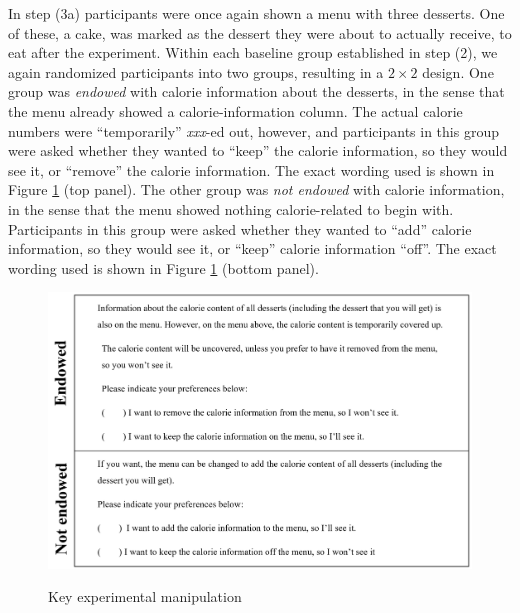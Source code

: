 
In step (3a) participants were once again shown a menu with three desserts. One of these, a cake, was marked as the dessert they were about to actually receive, to eat after the experiment. Within each baseline group established in step (2), we again randomized participants into two groups, resulting in a $2 \times 2$ design. One group was \emph{endowed} with calorie information about the desserts, in the sense that the menu already showed a calorie-information column. The actual calorie numbers were \enquote{temporarily} \emph{xxx}-ed out, however, and participants in this group were asked whether they wanted to \enquote{keep} the calorie information, so they would see it, or \enquote{remove} the calorie information. The exact wording used is shown in Figure \ref{fig:expManipulation} (top panel). The other group was \emph{not endowed} with calorie information, in the sense that the menu showed nothing calorie-related to begin with. Participants in this group were asked whether they wanted to \enquote{add} calorie information, so they would see it, or \enquote{keep} calorie information \enquote{off}. The exact wording used is shown in Figure  \ref{fig:expManipulation} (bottom panel).

\begin{figure}[ht]
  \caption{Key experimental manipulation}\label{fig:expManipulation}
  \begin{center}
  {\includegraphics[width=1\textwidth]{./figures/keyManipulation.png}}
  \end{center}
\end{figure}

